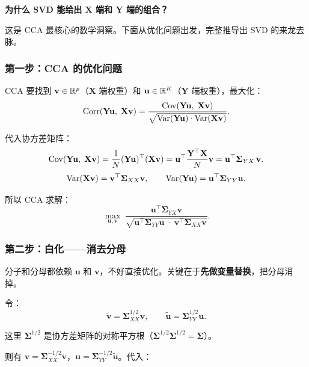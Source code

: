 \medskip
\noindent
\textbf{为什么 SVD 能给出 $\mathbf{X}$ 端和 $\mathbf{Y}$ 端的组合？}

这是 CCA 最核心的数学洞察。下面从优化问题出发，完整推导出 SVD 的来龙去脉。

\subsubsection{第一步：CCA 的优化问题}

CCA 要找到 $\mathbf{v} \in \mathbb{R}^p$（$\mathbf{X}$ 端权重）和 $\mathbf{u} \in \mathbb{R}^K$（$\mathbf{Y}$ 端权重），最大化：
\[
    \mathrm{Corr}(\mathbf{Y}\mathbf{u},\; \mathbf{X}\mathbf{v})
    = \frac{\mathrm{Cov}(\mathbf{Y}\mathbf{u},\; \mathbf{X}\mathbf{v})}
           {\sqrt{\mathrm{Var}(\mathbf{Y}\mathbf{u}) \cdot \mathrm{Var}(\mathbf{X}\mathbf{v})}}.
\]

代入协方差矩阵：
\[
    \mathrm{Cov}(\mathbf{Y}\mathbf{u},\; \mathbf{X}\mathbf{v})
    = \frac{1}{N} (\mathbf{Y}\mathbf{u})^\top (\mathbf{X}\mathbf{v})
    = \mathbf{u}^\top \frac{\mathbf{Y}^\top \mathbf{X}}{N} \mathbf{v}
    = \mathbf{u}^\top \bm{\Sigma}_{YX} \,\mathbf{v}.
\]
\[
    \mathrm{Var}(\mathbf{X}\mathbf{v}) = \mathbf{v}^\top \bm{\Sigma}_{XX} \mathbf{v},\qquad
    \mathrm{Var}(\mathbf{Y}\mathbf{u}) = \mathbf{u}^\top \bm{\Sigma}_{YY} \mathbf{u}.
\]

所以 CCA 求解：
\[
    \max_{\mathbf{u}, \mathbf{v}} \;
    \frac{\mathbf{u}^\top \bm{\Sigma}_{YX} \mathbf{v}}
         {\sqrt{\mathbf{u}^\top \bm{\Sigma}_{YY} \mathbf{u} \;\cdot\; \mathbf{v}^\top \bm{\Sigma}_{XX} \mathbf{v}}}.
\]

\subsubsection{第二步：白化——消去分母}

分子和分母都依赖 $\mathbf{u}$ 和 $\mathbf{v}$，不好直接优化。关键在于\textbf{先做变量替换}，把分母消掉。

令：
\[
    \tilde{\mathbf{v}} = \bm{\Sigma}_{XX}^{1/2} \mathbf{v},\qquad
    \tilde{\mathbf{u}} = \bm{\Sigma}_{YY}^{1/2} \mathbf{u}.
\]

这里 $\bm{\Sigma}^{1/2}$ 是协方差矩阵的对称平方根（$\bm{\Sigma}^{1/2}\bm{\Sigma}^{1/2} = \bm{\Sigma}$）。

则有 $\mathbf{v} = \bm{\Sigma}_{XX}^{-1/2} \tilde{\mathbf{v}}$，$\mathbf{u} = \bm{\Sigma}_{YY}^{-1/2} \tilde{\mathbf{u}}$。代入：

